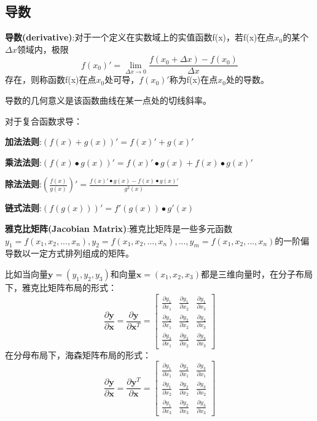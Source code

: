 \documentclass[openbib]{article}
\begin{document}
\subsection{导数}
\textbf{导数(derivative)}:对于一个定义在实数域上的实值函数f(x)，若f(x)在点$x_0$的某个$\Delta x$领域内，极限$$f(x_0)'=\lim_{\Delta x \to 0} \frac{f(x_0+\Delta x)-f(x_0)}{\Delta x}$$
存在，则称函数f(x)在点$x_0$处可导，$f(x_0)'$称为f(x)在点$x_0$处的导数。

导数的几何意义是该函数曲线在某一点处的切线斜率。

对于复合函数求导：

\textbf{加法法则}:$(f(x)+g(x))'=f(x)'+g(x)'$

\textbf{乘法法则}:$(f(x)\bullet g(x))'=f(x)'\bullet g(x)+f(x)\bullet g(x)'$

\textbf{除法法则}:$(\frac{f(x)}{g(x)})'=\frac{f(x)'\bullet g(x)-f(x)\bullet g(x)'}{g^2(x)}$

\textbf{链式法则}:$(f(g(x)))'=f'(g(x))\bullet g'(x)$

\textbf{雅克比矩阵(Jacobian Matrix)}:雅克比矩阵是一些多元函数$y_1=f(x_1,x_2,...,x_n),y_2=f(x_1,x_2,...,x_n),...,y_m=f(x_1,x_2,...,x_n)$的一阶偏导数以一定方式排列组成的矩阵。

比如当向量$\textbf{y}=(y_1,y_2,y_3)$和向量$\textbf{x}=(x_1,x_2,x_3)$都是三维向量时，在分子布局下，雅克比矩阵布局的形式：
$$\frac{\partial \textbf{y}}{\partial \textbf{x}}=\frac{\partial \textbf{y}}{\partial \textbf{x}^T}=\begin{bmatrix}
	\frac{\partial y_1}{\partial x_1} & \frac{\partial y_1}{\partial x_2} & \frac{\partial y_1}{\partial x_3} \\
	\frac{\partial y_2}{\partial x_1} & \frac{\partial y_2}{\partial x_2} & \frac{\partial y_2}{\partial x_3} \\
	\frac{\partial y_3}{\partial x_1} & \frac{\partial y_3}{\partial x_2} & \frac{\partial y_3}{\partial x_3}
\end{bmatrix}$$
在分母布局下，海森矩阵布局的形式：
$$\frac{\partial \textbf{y}}{\partial \textbf{x}}=\frac{\partial \textbf{y}^T}{\partial \textbf{x}}=\begin{bmatrix}
	\frac{\partial y_1}{\partial x_1} & \frac{\partial y_2}{\partial x_1} & \frac{\partial y_3}{\partial x_1} \\
	\frac{\partial y_1}{\partial x_2} & \frac{\partial y_2}{\partial x_2} & \frac{\partial y_3}{\partial x_2} \\
	\frac{\partial y_1}{\partial x_3} & \frac{\partial y_2}{\partial x_3} & \frac{\partial y_3}{\partial x_3}
\end{bmatrix}$$
\end{document}
